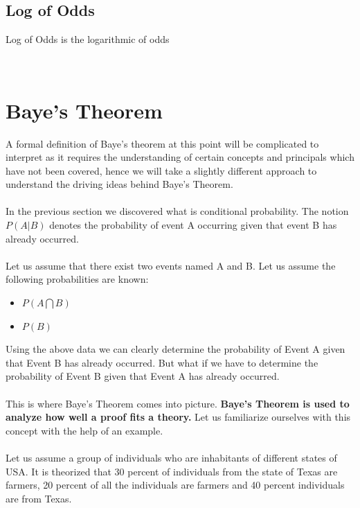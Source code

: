 \documentclass[twoside,12pt]{report}  %
\begin{document}
\subsection{Log of Odds}

\begin{tcolorbox}[colback=red!5!white, colframe=red!75!black, title = \textbf{Log of Odds}]
	Log of Odds is the logarithmic of odds
\end{tcolorbox}
\noindent
\\
\section{Baye's Theorem}

A formal definition of Baye's theorem at this point will be complicated to interpret as it requires the understanding of certain concepts and principals which have not been covered, hence we will take a slightly different approach to understand the driving ideas behind Baye's Theorem.
\\
\\
In the previous section we discovered what is conditional probability. The notion $P(A|B)$ denotes the probability of event A occurring given that event B has already occurred.
\\
\\
Let us assume that there exist two events named A and B. Let us assume the following probabilities are known:
\begin{itemize}
	\item $ P(A \bigcap B) $
	\item $ P(B) $
\end{itemize}
\noindent
Using the above data we can clearly determine the probability of Event A given that Event B has already occurred. But what if we have to determine the probability of Event B given that Event A has already occurred.
\\
\\
This is where Baye's Theorem comes into picture. \textbf{Baye's Theorem is used to analyze how well a proof fits a theory.} Let us familiarize ourselves with this concept with the help of an example.
\\
\\
Let us assume a group of individuals who are inhabitants of different states of USA. It is theorized that 30 percent of individuals from the state of Texas are farmers, 20 percent of all the individuals are farmers and 40 percent individuals are from Texas.
\\
\end{document}
